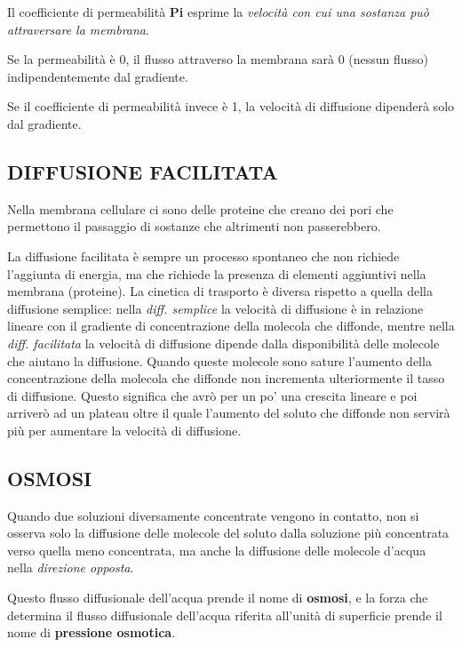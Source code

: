 \documentclass[]{article}
\begin{document}
Il coefficiente di permeabilità \textbf{Pi} esprime la \emph{velocità
con cui una sostanza può attraversare la membrana}.

Se la permeabilità è 0, il flusso attraverso la membrana sarà 0 (nessun
flusso) indipendentemente dal gradiente.

Se il coefficiente di permeabilità invece è 1, la velocità di diffusione
dipenderà solo dal gradiente.

\subsection{DIFFUSIONE FACILITATA}\label{diffusione-facilitata}

Nella membrana cellulare ci sono delle proteine che creano dei pori che
permettono il passaggio di sostanze che altrimenti non passerebbero.

La diffusione facilitata è sempre un processo spontaneo che non richiede
l'aggiunta di energia, ma che richiede la presenza di elementi
aggiuntivi nella membrana (proteine). La cinetica di trasporto è diversa
rispetto a quella della diffusione semplice: nella \emph{diff. semplice}
la velocità di diffusione è in relazione lineare con il gradiente di
concentrazione della molecola che diffonde, mentre nella \emph{diff.
facilitata} la velocità di diffusione dipende dalla disponibilità delle
molecole che aiutano la diffusione. Quando queste molecole sono sature
l'aumento della concentrazione della molecola che diffonde non
incrementa ulteriormente il tasso di diffusione. Questo significa che
avrò per un po' una crescita lineare e poi arriverò ad un plateau oltre
il quale l'aumento del soluto che diffonde non servirà più per aumentare
la velocità di diffusione.

\subsection{OSMOSI}\label{osmosi}

Quando due soluzioni diversamente concentrate vengono in contatto, non
si osserva solo la diffusione delle molecole del soluto dalla soluzione
più concentrata verso quella meno concentrata, ma anche la diffusione
delle molecole d'acqua nella \emph{direzione opposta}.

Questo flusso diffusionale dell'acqua prende il nome di \textbf{osmosi},
e la forza che determina il flusso diffusionale dell'acqua riferita
all'unità di superficie prende il nome di \textbf{pressione osmotica}.
\end{document}

